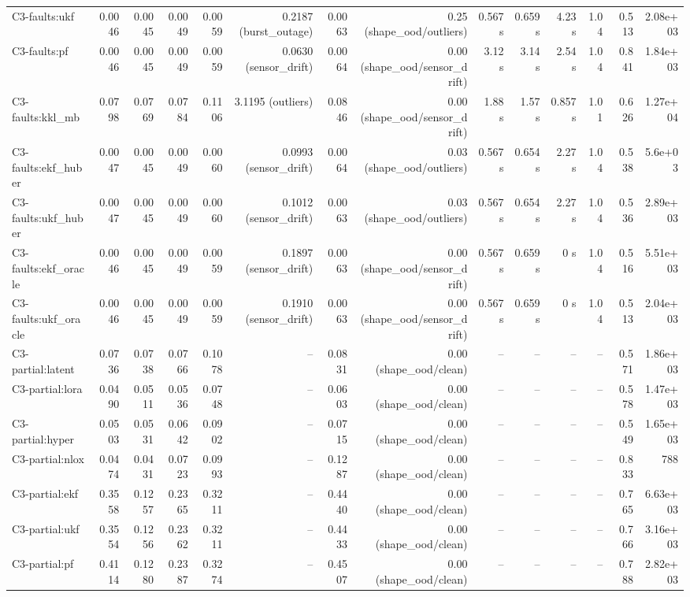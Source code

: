 \begin{table}[t]
\begin{tabular}{lrrrrrrrrrrrrr}
C3-faults:ukf & 0.0046 & 0.0045 & 0.0049 & 0.0059 & 0.2187 (burst\_outage) & 0.0063 & 0.25 (shape\_ood/outliers) & 0.567 s & 0.659 s & 4.23 s & 1.04 & 0.513 & 2.08e+03 \\
C3-faults:pf & 0.0046 & 0.0045 & 0.0049 & 0.0059 & 0.0630 (sensor\_drift) & 0.0064 & 0.00 (shape\_ood/sensor\_drift) & 3.12 s & 3.14 s & 2.54 s & 1.04 & 0.841 & 1.84e+03 \\
C3-faults:kkl\_mb & 0.0798 & 0.0769 & 0.0784 & 0.1106 & 3.1195 (outliers) & 0.0846 & 0.00 (shape\_ood/sensor\_drift) & 1.88 s & 1.57 s & 0.857 s & 1.01 & 0.626 & 1.27e+04 \\
C3-faults:ekf\_huber & 0.0047 & 0.0045 & 0.0049 & 0.0060 & 0.0993 (sensor\_drift) & 0.0064 & 0.03 (shape\_ood/outliers) & 0.567 s & 0.654 s & 2.27 s & 1.04 & 0.538 & 5.6e+03 \\
C3-faults:ukf\_huber & 0.0047 & 0.0045 & 0.0049 & 0.0060 & 0.1012 (sensor\_drift) & 0.0063 & 0.03 (shape\_ood/outliers) & 0.567 s & 0.654 s & 2.27 s & 1.04 & 0.536 & 2.89e+03 \\
C3-faults:ekf\_oracle & 0.0046 & 0.0045 & 0.0049 & 0.0059 & 0.1897 (sensor\_drift) & 0.0063 & 0.00 (shape\_ood/sensor\_drift) & 0.567 s & 0.659 s & 0 s & 1.04 & 0.516 & 5.51e+03 \\
C3-faults:ukf\_oracle & 0.0046 & 0.0045 & 0.0049 & 0.0059 & 0.1910 (sensor\_drift) & 0.0063 & 0.00 (shape\_ood/sensor\_drift) & 0.567 s & 0.659 s & 0 s & 1.04 & 0.513 & 2.04e+03 \\
C3-partial:latent & 0.0736 & 0.0738 & 0.0766 & 0.1078 & – & 0.0831 & 0.00 (shape\_ood/clean) & – & – & – & – & 0.571 & 1.86e+03 \\
C3-partial:lora & 0.0490 & 0.0511 & 0.0536 & 0.0748 & – & 0.0603 & 0.00 (shape\_ood/clean) & – & – & – & – & 0.578 & 1.47e+03 \\
C3-partial:hyper & 0.0503 & 0.0531 & 0.0642 & 0.0902 & – & 0.0715 & 0.00 (shape\_ood/clean) & – & – & – & – & 0.549 & 1.65e+03 \\
C3-partial:nlox & 0.0474 & 0.0431 & 0.0723 & 0.0993 & – & 0.1287 & 0.00 (shape\_ood/clean) & – & – & – & – & 0.833 & 788 \\
C3-partial:ekf & 0.3558 & 0.1257 & 0.2365 & 0.3211 & – & 0.4440 & 0.00 (shape\_ood/clean) & – & – & – & – & 0.765 & 6.63e+03 \\
C3-partial:ukf & 0.3554 & 0.1256 & 0.2362 & 0.3211 & – & 0.4433 & 0.00 (shape\_ood/clean) & – & – & – & – & 0.766 & 3.16e+03 \\
C3-partial:pf & 0.4114 & 0.1280 & 0.2387 & 0.3274 & – & 0.4507 & 0.00 (shape\_ood/clean) & – & – & – & – & 0.788 & 2.82e+03 \\

\end{tabular}
\end{table}
